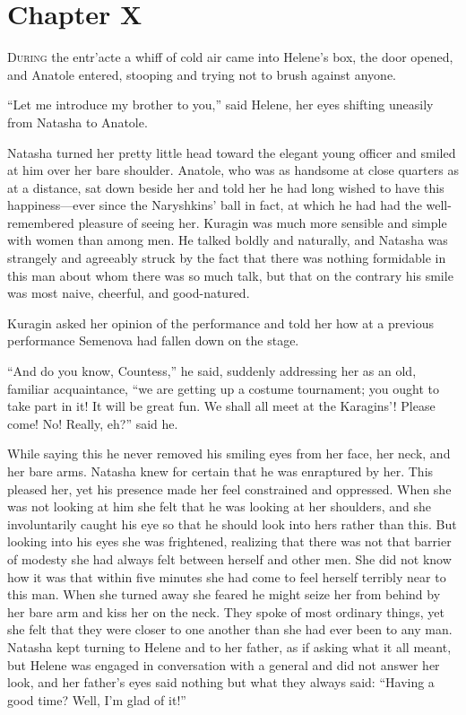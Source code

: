 \chapter*{Chapter X}
\ifaudio     
{} 
\fi

\lettrine[lines=2, loversize=0.3, lraise=0]{\initfamily D}{uring}
the entr'acte a whiff of cold air came into Helene's box,
the door opened, and Anatole entered, stooping and trying not to
brush against anyone.

``Let me introduce my brother to you,'' said Helene, her eyes
shifting uneasily from Natasha to Anatole.

Natasha turned her pretty little head toward the elegant young
officer and smiled at him over her bare shoulder. Anatole, who
was as handsome at close quarters as at a distance, sat down
beside her and told her he had long wished to have this
happiness---ever since the Naryshkins' ball in fact, at which he
had had the well-remembered pleasure of seeing her.  Kuragin was
much more sensible and simple with women than among men. He
talked boldly and naturally, and Natasha was strangely and
agreeably struck by the fact that there was nothing formidable in
this man about whom there was so much talk, but that on the
contrary his smile was most naive, cheerful, and good-natured.

Kuragin asked her opinion of the performance and told her how at
a previous performance Semenova had fallen down on the stage.

``And do you know, Countess,'' he said, suddenly addressing her
as an old, familiar acquaintance, ``we are getting up a costume
tournament; you ought to take part in it! It will be great
fun. We shall all meet at the Karagins'! Please come! No! Really,
eh?'' said he.

While saying this he never removed his smiling eyes from her
face, her neck, and her bare arms. Natasha knew for certain that
he was enraptured by her. This pleased her, yet his presence made
her feel constrained and oppressed. When she was not looking at
him she felt that he was looking at her shoulders, and she
involuntarily caught his eye so that he should look into hers
rather than this. But looking into his eyes she was frightened,
realizing that there was not that barrier of modesty she had
always felt between herself and other men. She did not know how
it was that within five minutes she had come to feel herself
terribly near to this man. When she turned away she feared he
might seize her from behind by her bare arm and kiss her on the
neck. They spoke of most ordinary things, yet she felt that they
were closer to one another than she had ever been to any
man. Natasha kept turning to Helene and to her father, as if
asking what it all meant, but Helene was engaged in conversation
with a general and did not answer her look, and her father's eyes
said nothing but what they always said: ``Having a good time?
Well, I'm glad of it!''

